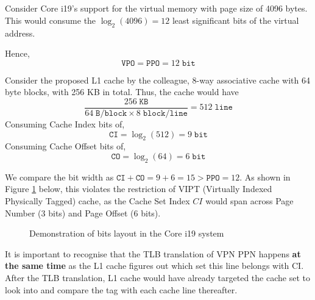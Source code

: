 \documentclass[12pt]{article}
\begin{document}
\section{}

\subsection{}

\subsubsection{}
\label{section:1ai}

Consider Core i19's support for the virtual memory with page size of 4096 bytes. This would consume the $\log_2(4096) = 12$ least significant bits of the virtual address. 

Hence,
$$\mathtt{VPO = PPO} = 12\; \mathtt{bit}$$

Consider the proposed L1 cache by the colleague, 8-way associative cache with 64 byte blocks, with 256 KB in total. Thus, the cache would have
$$ \frac{256\; \mathtt{KB}}{64\; \mathtt{B/block} \times 8 \; \mathtt{block/line}} = 512\; \mathtt{line}$$
Consuming Cache Index bits of,
$$ \mathtt{CI} = \log_2(512) = 9\; \mathtt{bit} $$
Consuming Cache Offset bits of,
$$ \mathtt{CO} = \log_2(64) = 6\; \mathtt{bit} $$

We compare the bit width as $\mathtt{CI + CO} = 9+6=15 > \mathtt{PPO} = 12 $. As shown in Figure \ref{fig:1a} below, this violates the restriction of VIPT (Virtually Indexed Physically Tagged) cache, as the Cache Set Index $CI$ would span across Page Number (3 bits) and Page Offset (6 bits).

\begin{figure}[h!]
  \caption{Demonstration of bits layout in the Core i19 system}
  \label{fig:1a}
\end{figure}

It is important to recognise that the TLB translation of VPN \textrightarrow{} PPN happens \textbf{at the same time} as the L1 cache figures out which set this line belongs with CI. After the TLB translation, L1 cache would have already targeted the cache set to look into and compare the tag with each cache line thereafter.
\end{document}
